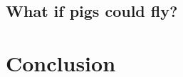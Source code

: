 \documentclass[12pt,a4paper]{article}
\begin{document}
\subsection{What if pigs could fly?} %

\section{Conclusion}

%
\end{document}

